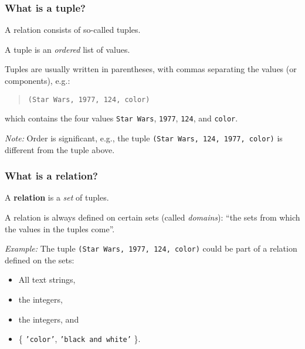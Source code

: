 \documentclass[english,serif,mathserif]{beamer}
\begin{document}
\begin{frame}[fragile]
  \frametitle{What is a tuple?}
  \small

  A relation consists of so-called tuples.

  \+
  A tuple is an \emph{ordered} list of values.

  \+
  Tuples are usually written in parentheses, with commas separating the
  values (or components), e.g.:

  \begin{quotation}
    \texttt{(Star Wars, 1977, 124, color)}
  \end{quotation}
  which contains the four values \texttt{Star Wars}, \texttt{1977},
  \texttt{124}, and \texttt{color}.

  \+
  \emph{Note:} Order is significant, e.g., the tuple \texttt{(Star Wars, 124, 1977,
    color)} is different from the tuple above.
\end{frame}


\begin{frame}
  \frametitle{What is a relation?}
  \small

  A \textbf{relation} is a \emph{set} of tuples.

  \+
  A relation is always defined on certain sets (called \emph{domains}):
  “the sets from which the values in the tuples come”.

  \+
  \emph{Example:} The tuple \texttt{(Star Wars, 1977, 124, color)} could be
  part of a relation defined on the sets:
  \begin{itemize}
  \item All text strings,
  \item the integers,
  \item the integers, and
  \item \{ \texttt{'color'}, \texttt{'black and white'} \}.
  \end{itemize}
\end{frame}
\end{document}
